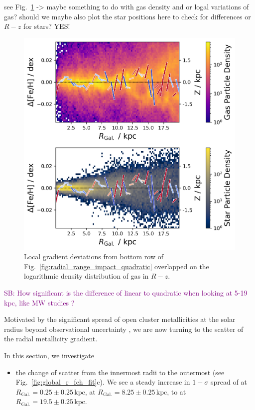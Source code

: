 \documentclass[fleqn,usenatbib]{mnras}
\newcommand{\SB}[1]{{\textcolor{purple}{SB: #1}}}
\begin{document}
see Fig.~\ref{fig:overlap_local_variation_gas} -> maybe something to do with gas density and or logal variations of gas? should we maybe also plot the star positions here to check for differences or $R-z$ for stars? YES!

\begin{figure}
    \centering
    \includegraphics[width=\columnwidth]{figures/overlap_local_variation_gas.png}
    \caption{Local gradient deviations from bottom row of Fig.~\ref{fig:radial_range_impact_quadratic} overlapped on the logarithmic density distribution of gas in $R-z$.}
    \label{fig:overlap_local_variation_gas}
\end{figure}


\SB{How significant is the difference of linear to quadratic when looking at 5-19 kpc, like MW studies \citep{Genovali2014}?}


Motivated by the significant spread of open cluster metallicities at the solar radius beyond observational uncertainty \citep[e.g.][]{Donor2020, Spina2021}, we are now turning to the scatter of the radial metallicity gradient.

In this section, we investigate
\begin{itemize}
    \item the change of scatter from the innermost radii to the outermost (see Fig.~\ref{fig:global_r_feh_fit}c). We see a steady increase in $1-\sigma$ spread of  at $R_\mathrm{Gal.} = 0.25 \pm 0.25\,\mathrm{kpc}$,  at $R_\mathrm{Gal.} = 8.25 \pm 0.25\,\mathrm{kpc}$, to  at $R_\mathrm{Gal.} = 19.5 \pm 0.25\,\mathrm{kpc}$.
\end{itemize}
\end{document}
